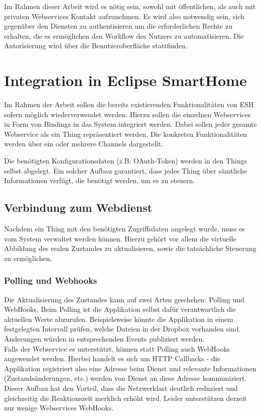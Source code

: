 Im Rahmen dieser Arbeit wird es nötig sein, sowohl mit öffentlichen, als auch mit privaten Webservices Kontakt aufzunehmen. Es wird also notwendig sein, sich gegenüber den Diensten zu authentisieren um die erforderlichen Rechte zu erhalten, die es ermöglichen den Workflow des Nutzers zu automatisieren. Die Autorisierung wird über die Benutzeroberfläche stattfinden.



\section{Integration in Eclipse SmartHome}
Im Rahmen der Arbeit sollen die bereits existierenden Funktionalitäten von ESH sofern möglich wiederverwendet werden. Hierzu sollen die einzelnen Webservices in Form von Bindings in das System integriert werden. 
Dabei sollen jeder gesamte Webservice als ein Thing repräsentiert werden. Die konkreten Funktionalitäten werden über ein oder mehrere Channels dargestellt.

Die benötigten Konfigurationsdaten (z.B. OAuth-Token) werden in den Things selbst abgelegt. Ein solcher Aufbau garantiert, dass jedes Thing über sämtliche Informationen verfügt, die benötigt werden, um es zu steuern. 

\subsection{Verbindung zum Webdienst}
Nachdem ein Thing mit den benötigten Zugriffsdaten angelegt wurde, muss es vom System verwaltet werden können. Hierzu gehört vor allem die virtuelle Abbildung des realen Zustandes zu aktualisieren, sowie die tatsächliche Steuerung zu ermöglichen. 

\subsubsection{Polling und Webhooks}
Die Aktualisierung des Zustandes kann auf zwei Arten geschehen: Polling und WebHooks. Beim Polling ist die Applikation selbst dafür verantwortlich die aktuellen Werte abzurufen. Beispielsweise könnte die Applikation in einem festgelegten Intervall prüfen, welche Dateien in der Dropbox vorhanden sind. Änderungen würden in entsprechenden Events publiziert werden.\\

Falls der Webservice es unterstützt, können statt Polling auch WebHooks angewendet werden. Hierbei handelt es sich um HTTP Callbacks - die Applikation registriert also eine Adresse beim Dienst und relevante Informationen (Zustandsänderungen, etc.) werden von Dienst an diese Adresse kommuniziert. Dieser Aufbau hat den Vorteil, dass die Netzwerklast deutlich reduziert und gleichzeitig die Reaktionszeit merklich erhöht wird. Leider unterstützen derzeit nur wenige Webservices WebHooks.


